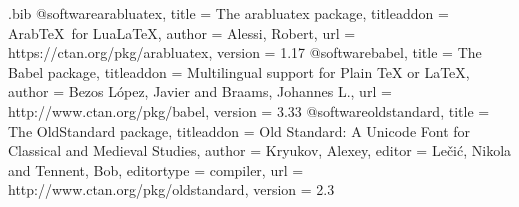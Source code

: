 \RequirePackage{filecontents}
\begin{filecontents*}{\jobname.bib}
@software{arabluatex,
  title =	 {The arabluatex package},
  titleaddon =	 {Arab\TeX\ for Lua\LaTeX},
  author =	 {Alessi, Robert},
  url =		 {https://ctan.org/pkg/arabluatex},
  version =	 {1.17}
}
@software{babel,
  title =	 {The Babel package},
  titleaddon =	 {Multilingual support for Plain TeX or LaTeX},
  author =	 {Bezos López, Javier and Braams, Johannes L.},
  url =		 {http://www.ctan.org/pkg/babel},
  version =	 {3.33}
}
@software{oldstandard,
  title =	 {The OldStandard package},
  titleaddon =	 {Old Standard: A Unicode Font for Classical and
                  Medieval Studies},
  author =	 {Kryukov, Alexey},
  editor =	 {Lečić, Nikola and Tennent, Bob},
  editortype =	 {compiler},
  url =		 {http://www.ctan.org/pkg/oldstandard},
  version =	 {2.3}
}
\end{filecontents*}
\documentclass[letterpaper]{article}
\usepackage{fontspec}
\usepackage[greek.ancient,english]{babel}

[RawFeature={+ss05;+ss06}]{Old Standard}

\newlength{}
\setlength{}
\usepackage{dtxdescribe}
\setlength\parindent{\defaultparindent}

\usepackage[xindy]{imakeidx}
\makeindex

\usepackage{latexcolors}
\usepackage{csquotes}
\usepackage{varioref}
\usepackage{hyperref}
\usepackage{uri}

\usepackage{enumitem}
\usepackage{metalogox}
\usepackage{lettrine}
\usepackage{setspace}

\usepackage{relsize}
\usepackage{tikz}
\usepackage[breakable, skins, xparse, minted]{tcolorbox}

